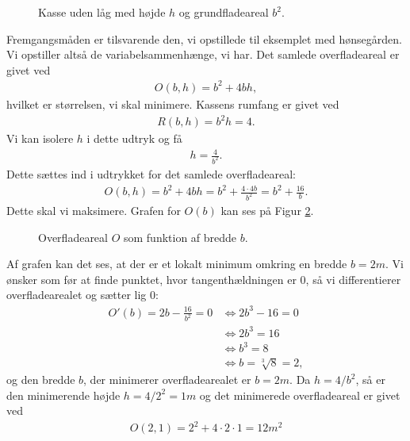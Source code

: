 \begin{exa}
\begin{figure}[H]
\caption{Kasse uden låg med højde $h$ og grundfladeareal $b^2$.}
\label{fig:kasse}
\end{figure}
Fremgangsmåden er tilsvarende den, vi opstillede til eksemplet med hønsegården. Vi opstiller altså de variabelsammenhænge, vi har. Det samlede overfladeareal er givet ved
\begin{align*}
O(b,h) = b^2+4bh,
\end{align*}
hvilket er størrelsen, vi skal minimere. Kassens rumfang er givet ved
\begin{align*}
R(b,h) = b^2h = 4.
\end{align*}
Vi kan isolere $h$ i dette udtryk og få
\begin{align*}
h = \frac{4}{b^2}.
\end{align*}
Dette sættes ind i udtrykket for det samlede overfladeareal:
\begin{align*}
O(b,h) = b^2+ 4bh = b^2 + \frac{4\cdot4b}{b^2} = b^2+\frac{16}{b}.
\end{align*}
Dette skal vi maksimere. Grafen for $O(b)$ kan ses på Figur \ref{fig:kassegraf}.
\begin{figure}[H]
	\centering
	\caption{Overfladeareal $O$ som funktion af bredde $b$.}
	\label{fig:kassegraf}
\end{figure}

Af grafen kan det ses, at der er et lokalt minimum omkring en bredde $b=2m$. Vi ønsker som før at finde punktet, hvor tangenthældningen er $0$, så vi differentierer overfladearealet og sætter lig $0$:
\begin{align*}
O'(b) = 2b-\frac{16}{b^2}=0&\Leftrightarrow 2b^3-16=0\\
						&\Leftrightarrow 2b^3 = 16\\
						&\Leftrightarrow b^3 = 8\\
						&\Leftrightarrow b = \sqrt[3]{8} = 2,
\end{align*}
og den bredde $b$, der minimerer overfladearealet er $b=2m$. Da $h=4/b^2$, så er den minimerende højde $h=4/2^2=1m$ og det minimerede overfladeareal er givet ved
\begin{align*}
O(2,1) = 2^2+4\cdot 2\cdot 1 = 12m^2
\end{align*}
\end{exa}

